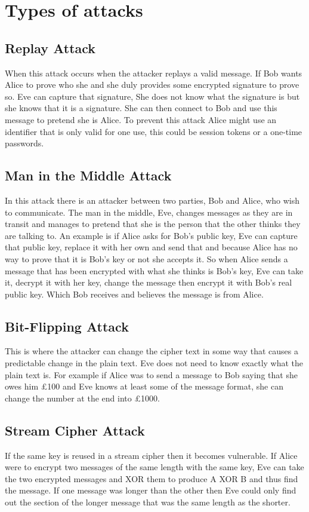\section{Types of attacks}

\subsection{Replay Attack}
When this attack occurs when the attacker replays a valid message. If Bob wants Alice to prove who she and she duly provides some encrypted signature to prove so. Eve can capture that signature, She does not know what the signature is but she knows that it is a signature. She can then connect to Bob and use this message to pretend she is Alice. To prevent this attack Alice might use an identifier that is only valid for one use, this could be session tokens or a one-time passwords. 

\subsection{Man in the Middle Attack}
In this attack there is an attacker between two parties, Bob and Alice, who wish to communicate. The man in the middle, Eve, changes messages as they are in transit and manages to pretend that she is the person that the other thinks they are talking to. An example is if Alice asks for Bob's public key, Eve can capture that public key, replace it with her own and send that and because Alice has no way to prove that it is Bob's key or not she accepts it. So when Alice sends a message that has been encrypted with what she thinks is Bob's key, Eve can take it, decrypt it with her key, change the message then encrypt it with Bob's real public key. Which Bob receives and believes the message is from Alice.

\subsection{Bit-Flipping Attack}
This is where the attacker can change the cipher text in some way that causes a predictable change in the plain text. Eve does not need to know exactly what the plain text is. For example if Alice was to send a message to Bob saying that she owes him £100 and Eve knows at least some of the message format, she can change the number at the end into £1000. 

\subsection{Stream Cipher Attack}
If the same key is reused in a stream cipher then it becomes vulnerable. If Alice were to encrypt two messages of the same length with the same key, Eve can take the two encrypted messages and XOR them to produce A XOR B and thus find the message. If one message was longer than the other then Eve could only find out the section of the longer message that was the same length as the shorter.

